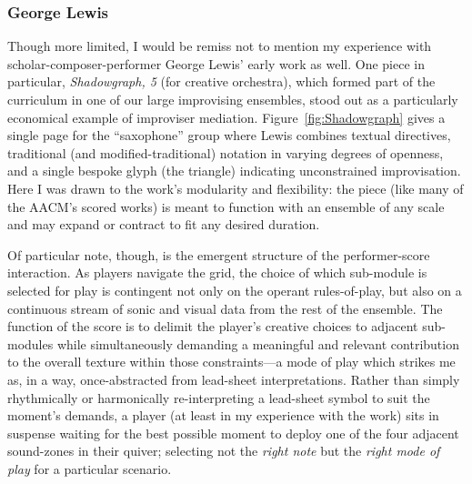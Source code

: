     \subsubsection{George Lewis} 
    Though more limited, I would be remiss not to mention my experience with scholar-composer-performer George Lewis' early work as well. One piece in particular, \textit{Shadowgraph, 5} (for creative orchestra), which formed part of the curriculum in one of our large improvising ensembles, stood out as a particularly economical example of improviser mediation. Figure~\ref{fig:Shadowgraph} gives a single page for the ``saxophone'' group where Lewis combines textual directives, traditional (and modified-traditional) notation in varying degrees of openness, and a single bespoke glyph (the triangle) indicating unconstrained improvisation. Here I was drawn to the work's modularity and flexibility: the piece (like many of the AACM's scored works) is meant to function with an ensemble of any scale and may expand or contract to fit any desired duration. 
    
    Of particular note, though, is the emergent structure of the performer-score interaction. As players navigate the grid, the choice of which sub-module is selected for play is contingent not only on the operant rules-of-play, but also on a continuous stream of sonic and visual data from the rest of the ensemble. The function of the score is to delimit the player's creative choices to adjacent sub-modules while simultaneously demanding a meaningful and relevant contribution to the overall texture within those constraints---a mode of play which strikes me as, in a way, once-abstracted from lead-sheet interpretations. Rather than simply rhythmically or harmonically re-interpreting a lead-sheet symbol to suit the moment's demands, a player (at least in my experience with the work) sits in suspense waiting for the best possible moment to deploy one of the four adjacent sound-zones in their quiver; selecting not the \textit{right note} but the \textit{right mode of play} for a particular scenario. 

